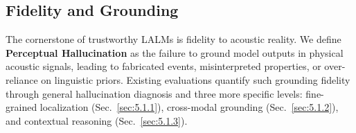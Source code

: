 

\subsection{Fidelity and Grounding}
\label{sec:5.1}

The cornerstone of trustworthy LALMs is fidelity to acoustic reality. We define \textbf{Perceptual Hallucination} as the failure to ground model outputs \cite{cheng2026aha, nwulist2026aabench, nwulist2026speechjailbreaker, zhao2026halluaudiocomprehensivebenchmarkhallucination} in physical acoustic signals, leading to fabricated events, misinterpreted properties, or over-reliance on linguistic priors. Existing evaluations quantify such grounding fidelity through general hallucination diagnosis and three more specific levels: fine-grained localization (Sec.~\ref{sec:5.1.1}), cross-modal grounding (Sec.~\ref{sec:5.1.2}), and contextual reasoning (Sec.~\ref{sec:5.1.3}).

